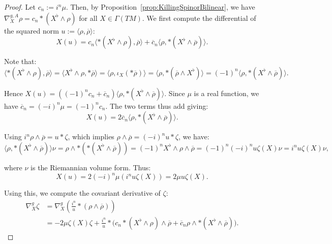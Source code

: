 \documentclass[10pt,a4paper]{amsart}
\newcommand{\escal}[1]{\langle#1\rangle}
\begin{document}
\begin{proof}
Let $c_n:=i^n\mu$. Then, by Proposition~\ref{prop:KillingSpinorBilinear}, we have $\nabla^{g,A}_X\rho=c_n*(X^\flat\wedge\rho)$ for all $X\in\Gamma(TM)$. We first compute the differential of the squared norm $u:=\escal{\rho,\overline{\rho}}$:
\begin{equation*}
X(u)=c_n\escal{*(X^\flat\wedge\rho),\overline{\rho}}+\overline{c}_n\escal{\rho,*(X^\flat\wedge\overline{\rho})}.
\end{equation*}

\noindent
Note that:
\begin{equation*}
\escal{*(X^\flat\wedge\rho),\overline{\rho}}=\escal{X^\flat\wedge\rho,*\overline{\rho}}=\escal{\rho,\iota_X(*\overline{\rho})}=\escal{\rho,*(\overline{\rho}\wedge X^\flat)}=(-1)^n\escal{\rho,*(X^\flat\wedge\overline{\rho})}.
\end{equation*}

\noindent
Hence $X(u)=((-1)^nc_n+\overline{c}_n)\escal{\rho,*(X^\flat\wedge\overline{\rho})}$. Since $\mu$ is a real function, we have $\overline{c}_n=(-i)^n\mu=(-1)^n c_n$. The two terms thus add giving:
\begin{equation*}
X(u)=2\overline{c}_n\escal{\rho,*(X^\flat\wedge\overline{\rho})}.
\end{equation*}

\noindent
Using $i^n\rho\wedge\overline{\rho} = u *\zeta$, which implies $\rho\wedge\overline{\rho} = (-i)^n u *\zeta$, we have:
\begin{equation*}
\escal{\rho,*(X^\flat\wedge\overline{\rho})}\nu = \rho\wedge *(*(X^\flat\wedge\overline{\rho})) = (-1)^n X^\flat\wedge\rho\wedge\overline{\rho} = (-1)^n(-i)^n u\zeta(X)\nu = i^n u \zeta(X) \nu,
\end{equation*}

\noindent
where $\nu$ is the Riemannian volume form. Thus:
\begin{equation*}
X(u)=2(-i)^n\mu (i^n u\zeta(X))=2\mu u\zeta(X).
\end{equation*}

\noindent
Using this, we compute the covariant derivative of $\zeta$:
\begin{align*}
\nabla^{g}_X\zeta &= \nabla^{g}_X \left(\frac{i^n}{u} *(\rho\wedge\overline{\rho})\right)\\ 
&= -2\mu\zeta(X)\zeta+\frac{i^n}{u}*\big(c_n*(X^\flat\wedge\rho)\wedge\overline{\rho} + \overline{c}_n\rho\wedge *(X^\flat\wedge\overline{\rho})\big).
\end{align*}


\end{proof}
\end{document}
